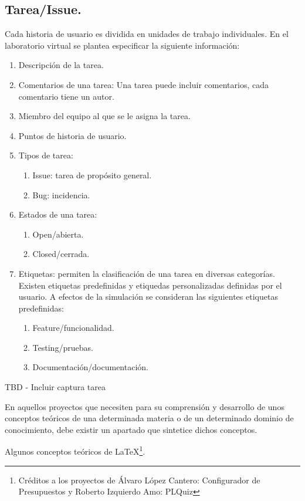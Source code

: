 \subsection{Tarea/Issue.}

Cada historia de usuario es dividida en unidades de trabajo individuales. En el laboratorio virtual se plantea especificar la siguiente información:

\begin{enumerate}
	\item Descripción de la tarea.
	\item Comentarios de una tarea: Una tarea puede incluir comentarios, cada comentario tiene un autor.
	\item Miembro del equipo al que se le asigna la tarea.
	\item Puntos de historia de usuario.
	\item Tipos de tarea:
		\begin{enumerate}
			\item Issue: tarea de propósito general.
			\item Bug: incidencia.
		\end{enumerate}
	\item Estados de una tarea:
		\begin{enumerate}
			\item Open/abierta.
			\item Closed/cerrada.
		\end{enumerate}
	\item Etiquetas: permiten la clasificación de una tarea en diversas categorías. Existen etiquetas predefinidas y etiquedas personalizadas definidas por el usuario. A efectos de la simulación se consideran las siguientes etiquetas predefinidas:	
		\begin{enumerate}
			\item Feature/funcionalidad.
			\item Testing/pruebas.
			\item Documentación/documentación.
		\end{enumerate}
\end{enumerate}

TBD - Incluir captura tarea

En aquellos proyectos que necesiten para su comprensión y desarrollo de unos conceptos teóricos de una determinada materia o de un determinado dominio de conocimiento, debe existir un apartado que sintetice dichos conceptos.

Algunos conceptos teóricos de \LaTeX \footnote{Créditos a los proyectos de Álvaro López Cantero: Configurador de Presupuestos y Roberto Izquierdo Amo: PLQuiz}.

